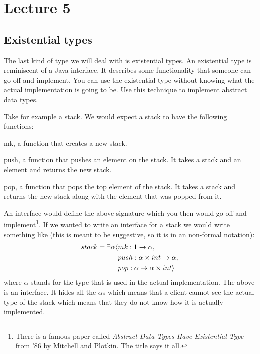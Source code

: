 \section*{Lecture 5}

\subsection*{Existential types}
The last kind of type we will deal with is existential types. An existential type is reminiscent of a Java interface. It describes some functionality that someone can go off and implement. You can use the existential type without knowing what the actual implementation is going to be. Use this technique to implement abstract data types.

Take for example a stack. We would expect a stack to have the following functions:
\begin{description}
  \item{mk}, a function that creates a new stack.
  \item{push}, a function that pushes an element on the stack. It takes a stack and an element and returns the new stack.
  \item{pop}, a function that pops the top element of the stack. It takes a stack and returns the new stack along with the element that was popped from it.
\end{description}
An interface would define the above signature which you then would go off and implement\footnote{There is a famous paper called \emph{Abstract Data Types Have Existential Type} from '86 by Mitchell and Plotkin. The title says it all.}. If we wanted to write an interface for a stack we would write something like (this is meant to be suggestive, so it is in an non-formal notation):
\begin{align*}
  stack = \exists \alpha \langle & mk:  1 \rightarrow \alpha, \\
                                 & push:  \alpha \times int \rightarrow \alpha, \\
                                 & pop:  \alpha \rightarrow \alpha \times int \rangle
\end{align*}
where $\alpha$ stands for the type that is used in the actual implementation. The above is an interface. It hides all the $\alpha$s which means that a client cannot see the actual type of the stack which means that they do not know how it is actually implemented.

